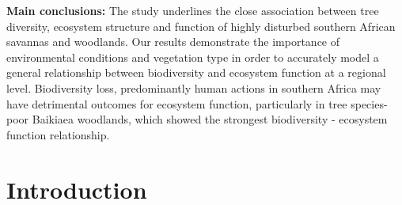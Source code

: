\documentclass[11pt,a4paper]{article}
\begin{document}
\textbf{Main conclusions:} The study underlines the close association between tree diversity, ecosystem structure and  function of highly disturbed southern African savannas and woodlands. Our results demonstrate the importance of  environmental conditions and vegetation type in order to accurately model a general relationship between biodiversity and ecosystem function at a regional level. Biodiversity loss, predominantly  human actions in southern Africa may have detrimental outcomes for ecosystem function, particularly in tree species-poor Baikiaea woodlands, which showed the strongest biodiversity - ecosystem function relationship.


\section{Introduction}
\end{document}
